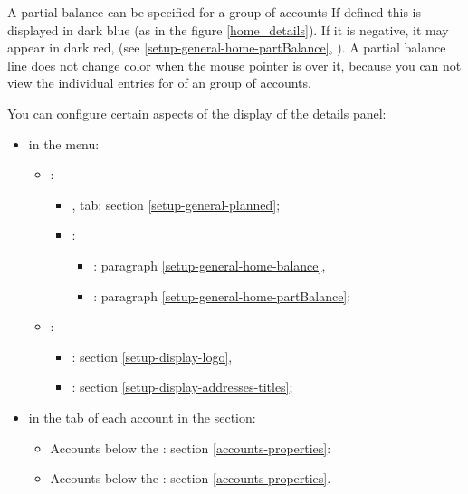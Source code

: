 A partial balance can be specified for a group of accounts  If defined this is displayed in \textcolor[RGB]{40,40,255}{dark blue} (as in the figure \vref{home_details}). If it is negative, it may appear in \textcolor[RGB]{153,0,0}{dark red}, (see  \vref{setup-general-home-partBalance}, ). A partial balance line does not change color when the mouse pointer is over it, because you can not view the individual entries for of an group of accounts.

You can configure certain aspects of the display of the details panel:
\begin{itemize}
	\item in the  menu:
	\begin{itemize}
		\item {}:
		\begin{itemize}
			\item {},  tab: section \vref{setup-general-planned};
			\item {}:
			\begin{itemize}
				\item {}: paragraph \vref{setup-general-home-balance},
				\item {}: paragraph \vref{setup-general-home-partBalance};
			\end{itemize}
		\end{itemize}
		\item {}:
		\begin{itemize}
			\item {}: section \vref{setup-display-logo},
			\item {}: section \vref{setup-display-addresses-titles};
		\end{itemize}
	\end{itemize}
	\item in the  tab of each account in the  section:
	\begin{itemize}
		\item Accounts below the : section \vref{accounts-properties}:
		\item Accounts below the : section  \vref{accounts-properties}.
	\end{itemize}
\end{itemize}

